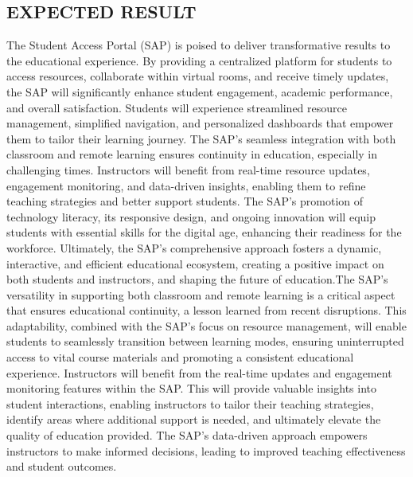 \begin{center}
\section{EXPECTED RESULT}
\end{center}
The Student Access Portal (SAP) is poised to deliver transformative results to the educational experience. By providing a centralized platform for students to access resources, collaborate within virtual rooms, and receive timely updates, the SAP will significantly enhance student engagement, academic performance, and overall satisfaction. Students will experience streamlined resource management, simplified navigation, and personalized dashboards that empower them to tailor their learning journey. The SAP's seamless integration with both classroom and remote learning ensures continuity in education, especially in challenging times. Instructors will benefit from real-time resource updates, engagement monitoring, and data-driven insights, enabling them to refine teaching strategies and better support students. The SAP's promotion of technology literacy, its responsive design, and ongoing innovation will equip students with essential skills for the digital age, enhancing their readiness for the workforce. Ultimately, the SAP's comprehensive approach fosters a dynamic, interactive, and efficient educational ecosystem, creating a positive impact on both students and instructors, and shaping the future of education.The SAP's versatility in supporting both classroom and remote learning is a critical aspect that ensures educational continuity, a lesson learned from recent disruptions. This adaptability, combined with the SAP's focus on resource management, will enable students to seamlessly transition between learning modes, ensuring uninterrupted access to vital course materials and promoting a consistent educational experience.
Instructors will benefit from the real-time updates and engagement monitoring features within the SAP. This will provide valuable insights into student interactions, enabling instructors to tailor their teaching strategies, identify areas where additional support is needed, and ultimately elevate the quality of education provided. The SAP's data-driven approach empowers instructors to make informed decisions, leading to improved teaching effectiveness and student outcomes.
\newpage